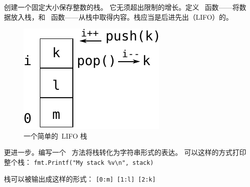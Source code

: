 \begin{Exercise}[title={栈},difficulty=1]
\label{ex:stack}
\Question \label{ex:stack q1} 创建一个固定大小保存整数的栈。
它无须超出限制的增长。定义~ 
函数——将数据放入栈，和~ 
函数——从栈中取得内容。栈应当是后进先出（LIFO）的。

\begin{figure}[H]
\caption{一个简单的~LIFO 栈}
\label{fig:stack}
\begin{center}
\includegraphics[scale=0.65]{fig/stack.pdf}
\end{center}
\end{figure}

\Question \label{ex:stack q2} 更进一步。编写一个~ 方法将栈转化为字符串形式的表达。
可以这样的方式打印整个栈：
\lstinline{fmt.Printf("My stack %v\n", stack)}

\noindent{}栈可以被输出成这样的形式：
\texttt{[0:m] [1:l] [2:k]}

\end{Exercise}

